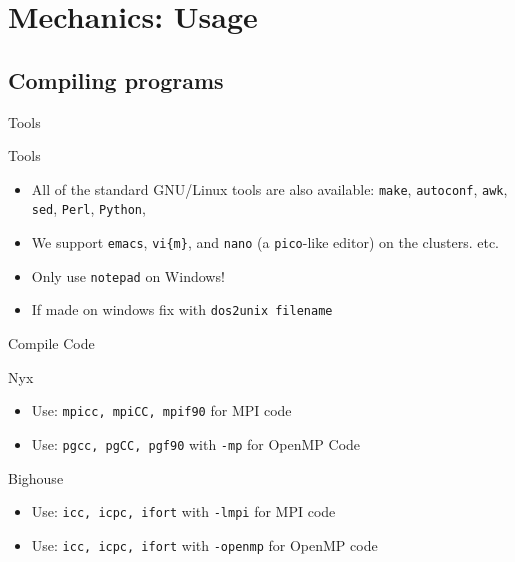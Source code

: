 \documentclass[handout]{beamer}
\begin{document}

  \section{Mechanics: Usage}
  \subsection{Compiling programs}
  \begin{frame}{Tools}
   \begin{block}{Tools}
    \begin{itemize}
    \item<1- > All of the standard GNU/Linux tools are also available: \texttt{make},
      \texttt{autoconf}, \texttt{awk}, \texttt{sed}, \texttt{Perl}, \texttt{Python},
    \item<2- > We support \texttt{emacs}, \texttt{vi\{m\}}, and \texttt{nano} (a 
      \texttt{pico}-like editor) on the clusters.
      etc.
    \item<3-| alert@1-> Only use \texttt{notepad} on Windows!
    \item<3-| alert@1-> If made on windows fix with \texttt{dos2unix filename}
    \end{itemize}
   \end{block}
  \end{frame}
  \begin{frame}{Compile Code}
   \begin{block}{Nyx}
   \begin{itemize}
    \item Use: \texttt{mpicc, mpiCC, mpif90} for MPI code
    \item Use: \texttt{pgcc, pgCC, pgf90} with \texttt{-mp} for OpenMP Code
   \end{itemize}
   \end{block}
   \begin{block}{Bighouse}
    \begin{itemize}
     \item Use: \texttt{icc, icpc, ifort} with \texttt{-lmpi} for MPI code
     \item Use: \texttt{icc, icpc, ifort} with \texttt{-openmp} for OpenMP code
    \end{itemize}
   \end{block}
  \end{frame}
\end{document}
